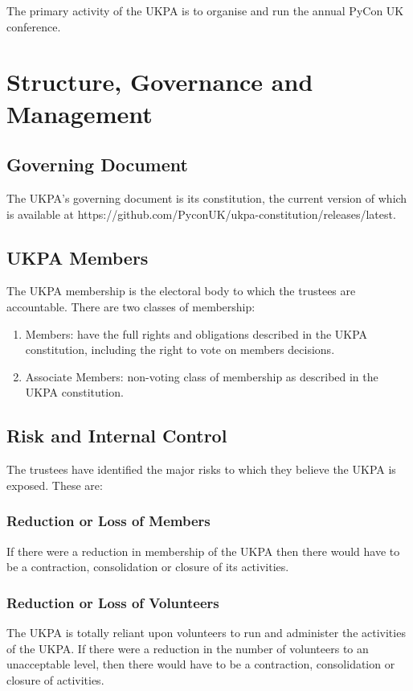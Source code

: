 \documentclass[11pt, final]{article}
\begin{document}
The primary activity of the UKPA is to organise and run the annual PyCon UK conference.

\section{Structure, Governance and Management}

\subsection{Governing Document}
The UKPA's governing document is its constitution, the current version of which is available at https://github.com/PyconUK/ukpa-constitution/releases/latest.

\subsection{UKPA Members}
The UKPA membership is the electoral body to which the trustees are accountable.
There are two classes of membership:

\begin{enumerate}
	\item Members: have the full rights and obligations described in the UKPA constitution, including the right to vote on members decisions.
	\item Associate Members: non-voting class of membership as described in the UKPA constitution.
\end{enumerate}

\subsection{Risk and Internal Control}
The trustees have identified the major risks to which they believe the UKPA is exposed. These are:

\subsubsection{Reduction or Loss of Members}
If there were a reduction in membership of the UKPA then there would have to be a contraction, consolidation or closure of its activities.

\subsubsection{Reduction or Loss of Volunteers}
The UKPA is totally reliant upon volunteers to run and administer the activities of the UKPA. If there were a reduction in the number of volunteers to an unacceptable level, then there would have to be a contraction, consolidation or closure of activities.
\end{document}
